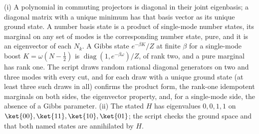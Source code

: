 (i) A polynomial in commuting projectors is diagonal in their joint eigenbasis; a diagonal matrix with a unique minimum has that basis vector as its unique ground state. A number basis state is a product of single-mode number states, its marginal on any set of modes is the corresponding number state, pure, and it is an eigenvector of each $N_{k}$. A Gibbs state $e^{-\beta K}/Z$ at finite $\beta$ for a single-mode boost $K = \omega(N - \tfrac12)$ is $\operatorname{diag}(1, e^{-\beta\omega})/Z$, of rank two, and a pure marginal has rank one. The script draws random rational diagonal generators on two and three modes with every cut, and for each draw with a unique ground state (at least three such draws in all) confirms the product form, the rank-one idempotent marginals on both sides, the eigenvector property, and, for a single-mode side, the absence of a Gibbs parameter. (ii) The stated $H$ has eigenvalues $0, 0, 1, 1$ on $\ket{00}, \ket{11}, \ket{10}, \ket{01}$; the script checks the ground space and that both named states are annihilated by $H$.
